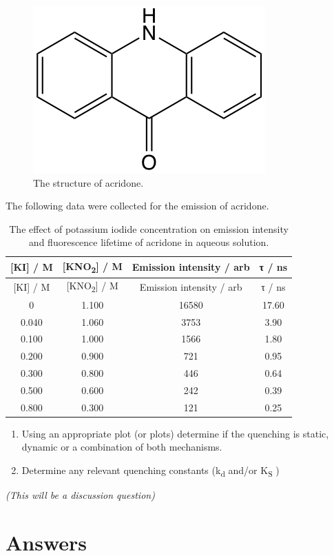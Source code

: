 \documentclass[
]{book}
\begin{document}
\begin{figure}

{\centering \includegraphics[width=0.3\linewidth]{images/acridone} 

}

\caption{The structure of acridone.}\label{fig:acridone}
\end{figure}

The following data were collected for the emission of acridone.

\begin{longtable}[]{@{}cccc@{}}
\caption{\label{tab:acridonequench} The effect of potassium iodide concentration on emission intensity and fluorescence lifetime of acridone in aqueous solution.}\tabularnewline
\toprule
{[}KI{]} / M & {[}KNO\textsubscript{2}{]} / M & Emission intensity / arb & τ / ns \\
\midrule
\endfirsthead
\toprule
{[}KI{]} / M & {[}KNO\textsubscript{2}{]} / M & Emission intensity / arb & τ / ns \\
\midrule
\endhead
0 & 1.100 & 16580 & 17.60 \\
0.040 & 1.060 & 3753 & 3.90 \\
0.100 & 1.000 & 1566 & 1.80 \\
0.200 & 0.900 & 721 & 0.95 \\
0.300 & 0.800 & 446 & 0.64 \\
0.500 & 0.600 & 242 & 0.39 \\
0.800 & 0.300 & 121 & 0.25 \\
\bottomrule
\end{longtable}

\begin{enumerate}
\def\labelenumi{\arabic{enumi}.}
\item
  Using an appropriate plot (or plots) determine if the quenching is static, dynamic or a combination of both mechanisms.
\item
  Determine any relevant quenching constants (k\textsubscript{d} and/or K\textsubscript{S} )
\end{enumerate}

\emph{(This will be a discussion question)}

\hypertarget{answers-1}{%
\section{Answers}\label{answers-1}}
\end{document}
